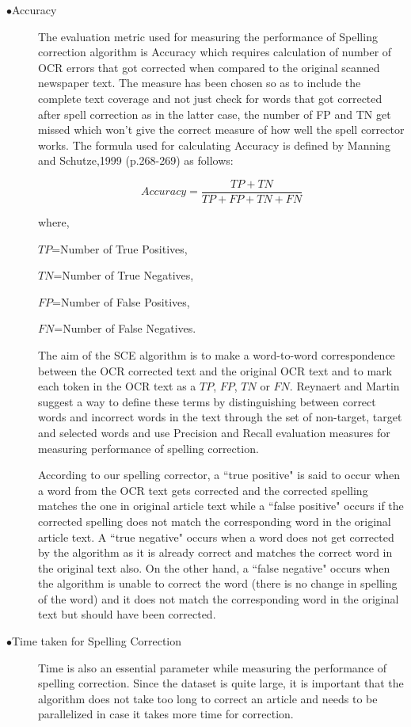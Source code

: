 \documentclass[12pt]{article}
\begin{document}
\begin{description}

 \item[$\bullet$Accuracy]
 The evaluation metric used for measuring the performance of Spelling correction algorithm is Accuracy which requires calculation of number of OCR errors that got corrected when compared to the original scanned newspaper text. The measure has been chosen so as to include the complete text coverage and not just check for words that got corrected after spell correction as in the latter case, the  number of FP and TN get missed which won't give the correct measure of how well the spell corrector works. The formula used for calculating Accuracy is defined by Manning and Schutze,1999 (p.268-269) as follows:

$$Accuracy=  \dfrac{TP+TN} {TP+ FP + TN + FN}$$


where, 

$TP$=Number of True Positives,

$TN$=Number of True Negatives,

 $FP$=Number of False Positives,

 $FN$=Number of False Negatives. 

The aim of the SCE algorithm is to make a word-to-word correspondence between the OCR corrected text and the original OCR text and to mark each token in the OCR text as a $TP$, $FP$, $TN$ or $FN$. Reynaert and Martin\cite{reynaert2008all} suggest a way to define these terms by distinguishing between correct words and incorrect words in the text through the set of non-target, target and selected words and use Precision and Recall evaluation measures for measuring performance of spelling correction. 

According to our spelling corrector, a ``true positive" is said to occur when a word from the OCR text gets corrected and the corrected spelling matches the one in original article text while a ``false positive" occurs if the corrected spelling does not match the corresponding word in the original article text. A ``true negative" occurs when a word does not get corrected by the algorithm as it is already correct and matches the correct word in the original text also. On the other hand, a ``false negative" occurs when the algorithm is unable to correct the word (there is no change in spelling of the word) and it does not match the corresponding word in the original text but should have been corrected.



\item[$\bullet$Time taken for Spelling Correction]
Time is also an essential parameter while measuring the performance of spelling correction. Since the dataset is quite large, it is important that the algorithm does not take too long to correct an article and needs to be parallelized in case it takes more time for correction.



\end{description}
\end{document}

